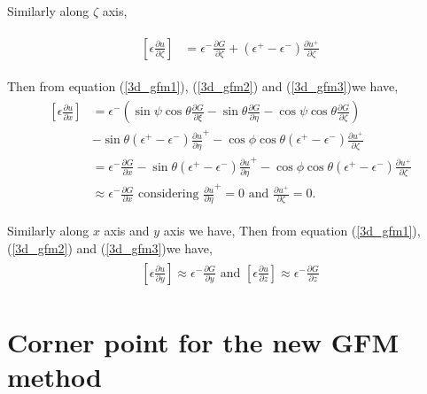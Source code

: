     Similarly along $\zeta $ axis, 
    
    \begin{eqnarray}
    \begin{aligned}
    \left[\epsilon \frac{\partial u}{\partial \zeta}\right]&= \epsilon^-\frac{\partial G}{\partial \zeta}+(\epsilon^+-\epsilon^-)\frac{\partial u^+}{\partial \zeta }\label{3d_gfm3}
    \end{aligned}
    \end{eqnarray}

    Then from equation (\ref{3d_gfm1}), (\ref{3d_gfm2}) and (\ref{3d_gfm3})we have,
    \begin{eqnarray}
    \begin{aligned}   
    		\left[\epsilon \frac{\partial u}{\partial x}\right]&= \epsilon^-\left( \sin \psi \cos \theta \frac{\partial G}{\partial \xi}-\sin \theta \frac{\partial G}{\partial \eta}-\cos \psi \cos \theta \frac{\partial G}{\partial \zeta}\right)\\
    		 &-\sin\theta (\epsilon^+-\epsilon^-)\frac{\partial u}{\partial \eta}^+ -\cos{\phi} \cos \theta (\epsilon^+-\epsilon^-) \frac{\partial u^+}{\partial \zeta }\\
    		 &=\epsilon^- \frac{\partial G}{\partial x}-\sin\theta (\epsilon^+-\epsilon^-)\frac{\partial u}{\partial \eta}^+ -\cos{\phi} \cos \theta (\epsilon^+-\epsilon^-) \frac{\partial u^+}{\partial \zeta }\\
    		 &\approx \epsilon^- \frac{\partial G}{\partial x}\text{     considering } \frac{\partial u}{\partial \eta}^+ =0 \text{ and } \frac{\partial u^+}{\partial \zeta }=0.  
    \end{aligned}		  	
    \end{eqnarray}

  Similarly along $x$ axis and $y$ axis we have, 
  Then from equation (\ref{3d_gfm1}), (\ref{3d_gfm2}) and (\ref{3d_gfm3})we have,
    \begin{eqnarray}
    \begin{aligned}  
   \left[\epsilon \frac{\partial u}{\partial y}\right]\approx\epsilon^- \frac{\partial G}{\partial y}\text{ and } \left[\epsilon \frac{\partial u}{\partial z}\right]\approx\epsilon^- \frac{\partial G}{\partial z}
    \end{aligned}		  	
    \end{eqnarray}

\section{Corner point for the new GFM method}

